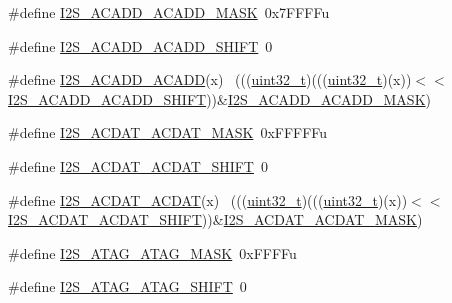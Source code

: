 \begin{DoxyCompactItemize}
\item 
\#define \hyperlink{group___i2_s___register___masks_ga86f515ec6a480c2aa3ee9150db64a7fc}{I2\+S\+\_\+\+A\+C\+A\+D\+D\+\_\+\+A\+C\+A\+D\+D\+\_\+\+M\+A\+SK}~0x7\+F\+F\+F\+Fu
\item 
\#define \hyperlink{group___i2_s___register___masks_gacc5eab5fc611b72be143a0140fc1f91e}{I2\+S\+\_\+\+A\+C\+A\+D\+D\+\_\+\+A\+C\+A\+D\+D\+\_\+\+S\+H\+I\+FT}~0
\item 
\#define \hyperlink{group___i2_s___register___masks_ga75e7d4065037c320701eaf103aeb5842}{I2\+S\+\_\+\+A\+C\+A\+D\+D\+\_\+\+A\+C\+A\+DD}(x)                                          ~(((\hyperlink{_p_e___types_8h_a33594304e786b158f3fb30289278f5af}{uint32\+\_\+t})(((\hyperlink{_p_e___types_8h_a33594304e786b158f3fb30289278f5af}{uint32\+\_\+t})(x))$<$$<$\hyperlink{group___i2_s___register___masks_gacc5eab5fc611b72be143a0140fc1f91e}{I2\+S\+\_\+\+A\+C\+A\+D\+D\+\_\+\+A\+C\+A\+D\+D\+\_\+\+S\+H\+I\+FT}))\&\hyperlink{group___i2_s___register___masks_ga86f515ec6a480c2aa3ee9150db64a7fc}{I2\+S\+\_\+\+A\+C\+A\+D\+D\+\_\+\+A\+C\+A\+D\+D\+\_\+\+M\+A\+SK})
\item 
\#define \hyperlink{group___i2_s___register___masks_gae7721b39bdc3284afd38f4bbfaebb7a8}{I2\+S\+\_\+\+A\+C\+D\+A\+T\+\_\+\+A\+C\+D\+A\+T\+\_\+\+M\+A\+SK}~0x\+F\+F\+F\+F\+Fu
\item 
\#define \hyperlink{group___i2_s___register___masks_ga21c14964811368a1fad04bc225140cf9}{I2\+S\+\_\+\+A\+C\+D\+A\+T\+\_\+\+A\+C\+D\+A\+T\+\_\+\+S\+H\+I\+FT}~0
\item 
\#define \hyperlink{group___i2_s___register___masks_ga9717e999340a25889710ecd434ffce46}{I2\+S\+\_\+\+A\+C\+D\+A\+T\+\_\+\+A\+C\+D\+AT}(x)                                          ~(((\hyperlink{_p_e___types_8h_a33594304e786b158f3fb30289278f5af}{uint32\+\_\+t})(((\hyperlink{_p_e___types_8h_a33594304e786b158f3fb30289278f5af}{uint32\+\_\+t})(x))$<$$<$\hyperlink{group___i2_s___register___masks_ga21c14964811368a1fad04bc225140cf9}{I2\+S\+\_\+\+A\+C\+D\+A\+T\+\_\+\+A\+C\+D\+A\+T\+\_\+\+S\+H\+I\+FT}))\&\hyperlink{group___i2_s___register___masks_gae7721b39bdc3284afd38f4bbfaebb7a8}{I2\+S\+\_\+\+A\+C\+D\+A\+T\+\_\+\+A\+C\+D\+A\+T\+\_\+\+M\+A\+SK})
\item 
\#define \hyperlink{group___i2_s___register___masks_gaef4fbbc71e936b494f848778db00974f}{I2\+S\+\_\+\+A\+T\+A\+G\+\_\+\+A\+T\+A\+G\+\_\+\+M\+A\+SK}~0x\+F\+F\+F\+Fu
\item 
\#define \hyperlink{group___i2_s___register___masks_gaad3cfb945e986391638fe140cc5912c2}{I2\+S\+\_\+\+A\+T\+A\+G\+\_\+\+A\+T\+A\+G\+\_\+\+S\+H\+I\+FT}~0

\end{DoxyCompactItemize}
